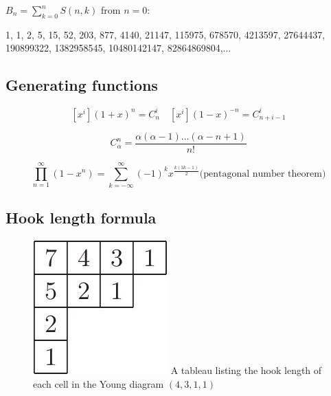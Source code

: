 $B_n = \sum_{k=0}^n S(n, k)$ from $n = 0$:

1, 1, 2, 5, 15, 52, 203, 877, 4140, 21147, 115975, 678570, 4213597, 27644437, 190899322, 1382958545, 10480142147, 82864869804,...

\subsection*{Generating functions}
$$[x^i](1 + x)^n = C_{n}^{i} \quad [x^i](1 - x)^{-n} = C_{n + i - 1}^{i}$$

$$C_{\alpha}^n = \frac{\alpha(\alpha - 1) \dots (\alpha - n + 1)}{n!}$$

$$\prod_{n = 1}^\infty (1 - x^n) = \sum_{k = -\infty}^{\infty} (-1)^k x^{\frac{k(3k - 1)}{2}} \text{(pentagonal number theorem)}$$

\subsection*{Hook length formula}

\begin{figure}
    \includegraphics[width=\linewidth]{content/mathematics/hook-length-tableau.jpg}
    A tableau listing the hook length of each cell in the Young diagram $(4, 3, 1, 1)$
\end{figure}

